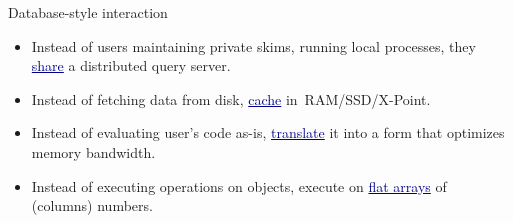\documentclass{beamer}
\begin{document}
\begin{frame}{Database-style interaction}
\vspace{0.5 cm}
\begin{itemize}\setlength{\itemsep}{0.25 cm}
\item<2-> Instead of users maintaining private skims, running local processes, they \textcolor{darkblue}{\underline{share}} a distributed query server.
\item<3-> Instead of fetching data from disk, \textcolor{darkblue}{\underline{cache}} \mbox{in RAM/SSD/X-Point.\hspace{-1 cm}}
\item<4-> Instead of evaluating user's code as-is, \textcolor{darkblue}{\underline{translate}} it into a form that optimizes memory bandwidth.
\item<5-> Instead of executing operations on objects, execute on \textcolor{darkblue}{\underline{flat arrays}} of (columns) numbers.
\end{itemize}
\end{frame}
\end{document}
